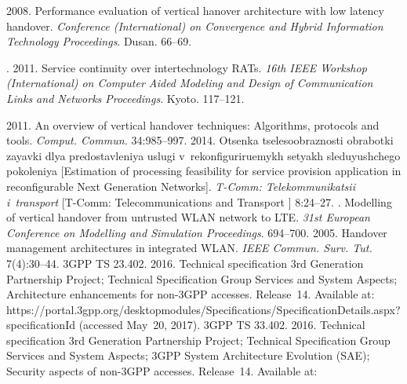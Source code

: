\begin{multicols}{2}
{{\begin{thebibliography}{99}
 2008. Performance evaluation of vertical hanover architecture 
with low latency handover. \textit{Conference (International) on Convergence and 
Hybrid Information Technology Proceedings}. Dusan. 66--69.


\columnbreak

. 2011. Service continuity over intertechnology RATs. \textit{16th 
IEEE  Workshop (International) on Computer Aided Modeling and Design of 
Communication Links and Networks Proceedings}. Kyoto. 117--121.

 2011. An overview of vertical handover techniques: Algorithms, 
protocols and tools. \textit{Comput. Commun.} 34:985--997.
 2014. Otsenka tselesoobraznosti obrabotki zayavki dlya 
predostavleniya uslugi v~re\-kon\-fi\-gu\-ri\-ru\-emykh setyakh sleduyushchego pokoleniya 
[Estimation of processing feasibility for service provision application in 
reconfigurable Next Generation Networks]. \textit{\mbox{T-Comm}: Te\-le\-kom\-mu\-ni\-ka\-tsii 
i~transport} [\mbox{T-Comm}: Telecommunications and Transport ] 8:24--27. 
. Modelling 
of vertical handover from untrusted WLAN network to LTE. \textit{31st European 
Conference on Modelling and Simulation Proceedings}. 694--700.
 2005. 
Handover management architectures in integrated WLAN. \textit{IEEE 
Commun. Surv.  Tut.} 7(4):30--44.
3GPP TS 23.402. 2016. Technical specification 3rd Generation Partnership Project; 
Technical Specification Group Services and System Aspects; Architecture 
enhancements for non-3GPP accesses. Release~14.  
Available at: {\sf 
https://portal.3gpp.org/desktopmodules/\linebreak Specifications/SpecificationDetails.aspx?specificationId} (accessed May~20, 2017).
3GPP TS 33.402. 2016. Technical specification 3rd Generation Partnership Project; 
Technical Specification Group Services and System Aspects; 3GPP System 
Architecture Evolution (SAE); Security aspects of non-3GPP accesses. Release~14. 
Available at: {\sf 
}
\end{thebibliography}}}
\end{multicols}
